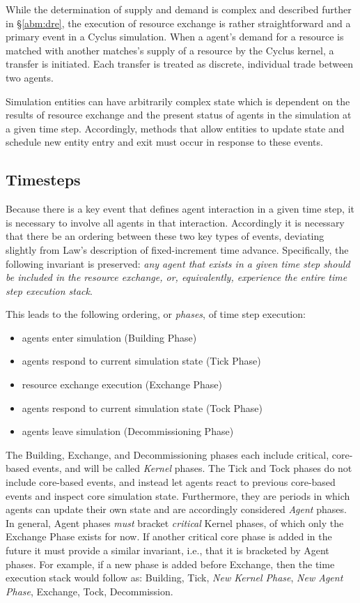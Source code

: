 While the determination of supply and demand is complex and described further in
\S \ref{abm:dre}, the execution of resource exchange is rather straightforward
and a primary event in a Cyclus simulation. When a agent's demand for a resource
is matched with another matches's supply of a resource by the Cyclus kernel, a
transfer is initiated. Each transfer is treated as discrete, individual trade
between two agents.

Simulation entities can have arbitrarily complex state which is dependent on the
results of resource exchange and the present status of agents in the simulation
at a given time step. Accordingly, methods that allow entities to update state
and schedule new entity entry and exit must occur in response to these events.

\subsection{Timesteps}

Because there is a key event that defines agent interaction in a given time
step, it is necessary to involve all agents in that interaction. Accordingly it
is necessary that there be an ordering between these two key types of events,
deviating slightly from Law's description of fixed-increment time
advance. Specifically, the following invariant is preserved: \textit{any agent
  that exists in a given time step should be included in the resource exchange,
  or, equivalently, experience the entire time step execution stack}.

This leads to the following ordering, or \textit{phases}, of time step
execution:

\begin{itemize}
\item agents enter simulation (Building Phase)
\item agents respond to current simulation state (Tick Phase)
\item resource exchange execution (Exchange Phase)
\item agents respond to current simulation state (Tock Phase)
\item agents leave simulation (Decommissioning Phase)
\end{itemize}

The Building, Exchange, and Decommissioning phases each include critical,
core-based events, and will be called \textit{Kernel} phases. The Tick and Tock
phases do not include core-based events, and instead let agents react to
previous core-based events and inspect core simulation state. Furthermore, they
are periods in which agents can update their own state and are accordingly
considered \textit{Agent} phases. In general, Agent phases \textit{must} bracket
\textit{critical} Kernel phases, of which only the Exchange Phase exists for
now. If another critical core phase is added in the future it must provide a
similar invariant, i.e., that it is bracketed by Agent phases. For example, if a
new phase is added before Exchange, then the time execution stack would follow
as: Building, Tick, \textit{New Kernel Phase}, \textit{New Agent Phase},
Exchange, Tock, Decommission.

